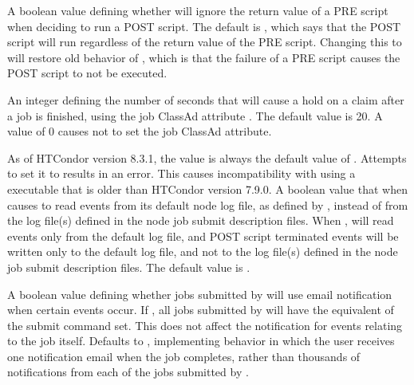 \begin{description}
\label{param:DAGmanAlwaysRunPost}
\item[\Macro{DAGMAN\_ALWAYS\_RUN\_POST}]
  A boolean value defining whether  will ignore the return value
  of a PRE script when deciding to run a POST script.  The default is
  , which says that the POST script will run regardless of the return
  value of the PRE script. Changing this to  will restore old
  behavior of , which is that the failure of a PRE script causes
  the POST script to not be executed.

\label{param:DAGmanHoldClaimTime}
\item[\Macro{DAGMAN\_HOLD\_CLAIM\_TIME}]
  An integer defining the number of seconds that  will cause a
  hold on a claim after a job is finished, 
  using the job ClassAd attribute .
  The default value is 20. 
  A value of 0 causes  not to set the job ClassAd attribute.

\label{param:DAGmanAlwaysUseNodeLog}
\item[\Macro{DAGMAN\_ALWAYS\_USE\_NODE\_LOG}]
  As of HTCondor version 8.3.1, the value is always the default 
  value of .  
  Attempts to set it to  results in an error. 
  This causes incompatibility with using a  executable 
  that is older than HTCondor version 7.9.0.
  A boolean value that when   causes  to read
  events from its default node log file, as defined by
  , instead of from the log file(s)
  defined in the node job submit description files.
  When ,
   will read events only from the default log
  file, and POST script terminated events will
  be written only to the default log file, and not to the
  log file(s) defined in the node job submit description files.
  The default value is .

\label{param:DAGmanSuppressNotification}
\item[\Macro{DAGMAN\_SUPPRESS\_NOTIFICATION}]
  A boolean value defining whether jobs submitted by  will use
  email notification when certain events occur.  
  If , 
  all jobs submitted by  will have the equivalent of the
  submit command  set. 
  This does not affect the notification for events relating to 
  the  job itself. 
  Defaults to , implementing behavior in which the user
  receives one notification email when the  job completes,
  rather than thousands of notifications from each of the jobs submitted by
  . 


\end{description}
